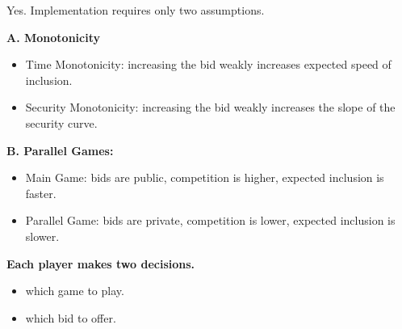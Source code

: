 \documentclass[11pt]{article}
\begin{document}
{\large
\linespread{1.15}\selectfont

Yes. Implementation requires only two assumptions.

}

\vspace{0.35cm}

{\large\bfseries
A. Monotonicity
}


\begin{itemize}
\item Time Monotonicity: increasing the bid weakly increases expected speed of inclusion.
\item Security Monotonicity: increasing the bid weakly increases the slope of the security curve.
\end{itemize}

\vspace{0.30cm}

{\large\bfseries
B. Parallel Games:
}

\begin{itemize}
\item Main Game: bids are public, competition is higher, expected inclusion is faster.
\item Parallel Game: bids are private, competition is lower, expected inclusion is slower.
\end{itemize}

\vspace{0.45cm}

{\large\bfseries
Each player makes two decisions.
}

\begin{itemize}
\item which game to play.
\item which bid to offer.
\end{itemize}

\vspace{0.55cm}
\end{document}
